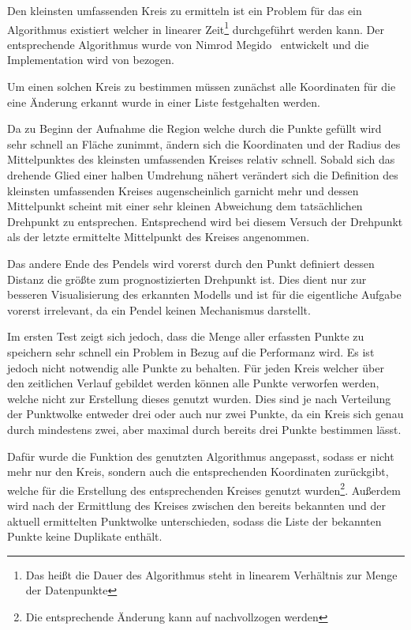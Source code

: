 Den kleinsten umfassenden Kreis zu ermitteln ist ein Problem für das ein Algorithmus existiert welcher in linearer Zeit\footnote{Das heißt die Dauer des Algorithmus steht in linearem Verhältnis zur Menge der Datenpunkte} durchgeführt werden kann.
Der entsprechende Algorithmus wurde von Nimrod Megido~\cite{Megiddo1983} entwickelt und die Implementation wird von  bezogen.


Um einen solchen Kreis zu bestimmen müssen zunächst alle Koordinaten für die eine Änderung erkannt wurde in einer Liste festgehalten werden.

Da zu Beginn der Aufnahme die Region welche durch die Punkte gefüllt wird sehr schnell an Fläche zunimmt, ändern sich die Koordinaten und der Radius des Mittelpunktes des kleinsten umfassenden Kreises relativ schnell.
Sobald sich das drehende Glied einer halben Umdrehung nähert verändert sich die Definition des kleinsten umfassenden Kreises augenscheinlich garnicht mehr und dessen Mittelpunkt scheint mit einer sehr kleinen Abweichung dem tatsächlichen Drehpunkt zu entsprechen.
Entsprechend wird bei diesem Versuch der Drehpunkt als der letzte ermittelte Mittelpunkt des Kreises angenommen.

Das andere Ende des Pendels wird vorerst durch den Punkt definiert dessen Distanz die größte zum prognostizierten Drehpunkt ist.
Dies dient nur zur besseren Visualisierung des erkannten Modells und ist für die eigentliche Aufgabe vorerst irrelevant, da ein Pendel keinen Mechanismus darstellt.

Im ersten Test zeigt sich jedoch, dass die Menge aller erfassten Punkte zu speichern sehr schnell ein Problem in Bezug auf die Performanz wird.
Es ist jedoch nicht notwendig alle Punkte zu behalten.
Für jeden Kreis welcher über den zeitlichen Verlauf gebildet werden können alle Punkte verworfen werden, welche nicht zur Erstellung dieses genutzt wurden.
Dies sind je nach Verteilung der Punktwolke entweder drei oder auch nur zwei Punkte, da ein Kreis sich genau durch mindestens zwei, aber maximal durch bereits drei Punkte bestimmen lässt.

Dafür wurde die Funktion des genutzten Algorithmus angepasst, sodass er nicht mehr nur den Kreis, sondern auch die entsprechenden Koordinaten zurückgibt, welche für die Erstellung des entsprechenden Kreises genutzt wurden\footnote{Die entsprechende Änderung kann auf  nachvollzogen werden}.
Außerdem wird nach der Ermittlung des Kreises zwischen den bereits bekannten und der aktuell ermittelten Punktwolke unterschieden, sodass die Liste der bekannten Punkte keine Duplikate enthält.

